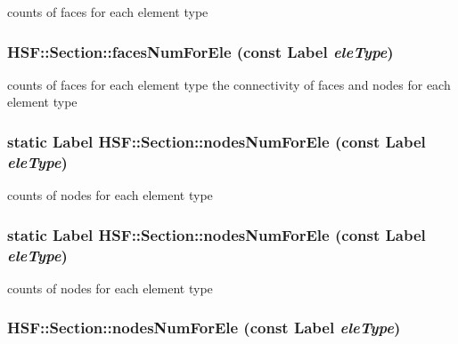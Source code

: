 counts of faces for each element type \hypertarget{classHSF_1_1Section_ae863db6a0bd22e6904903c0d1a1ea612}{
\subsubsection[{facesNumForEle}]{ HSF::Section::facesNumForEle (const {\bf Label} {\em eleType})}}
\label{classHSF_1_1Section_ae863db6a0bd22e6904903c0d1a1ea612}


counts of faces for each element type the connectivity of faces and nodes for each element type \hypertarget{classHSF_1_1Section_a253bd8ce6b49a2c7c46d3b2588a787a9}{
\subsubsection[{nodesNumForEle}]{\setlength{\rightskip}{0pt plus 5cm}static {\bf Label} HSF::Section::nodesNumForEle (const {\bf Label} {\em eleType})}}
\label{classHSF_1_1Section_a253bd8ce6b49a2c7c46d3b2588a787a9}


counts of nodes for each element type \hypertarget{classHSF_1_1Section_a253bd8ce6b49a2c7c46d3b2588a787a9}{
\subsubsection[{nodesNumForEle}]{\setlength{\rightskip}{0pt plus 5cm}static {\bf Label} HSF::Section::nodesNumForEle (const {\bf Label} {\em eleType})}}
\label{classHSF_1_1Section_a253bd8ce6b49a2c7c46d3b2588a787a9}


counts of nodes for each element type \hypertarget{classHSF_1_1Section_a2b8ea34f5ad6bb13a9aba3bb4be70900}{
\subsubsection[{nodesNumForEle}]{ HSF::Section::nodesNumForEle (const {\bf Label} {\em eleType})}}
\label{classHSF_1_1Section_a2b8ea34f5ad6bb13a9aba3bb4be70900}


